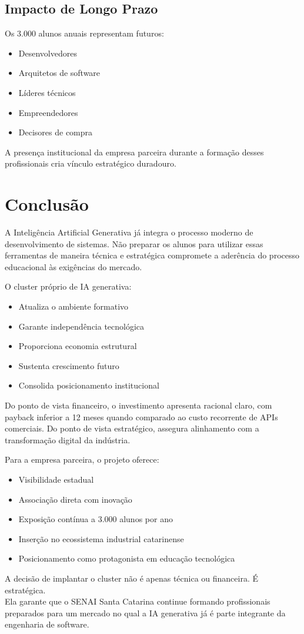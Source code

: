 \documentclass[12pt,a4paper,]{abntex2}
\begin{document}
\section{Impacto de Longo Prazo}
Os 3.000 alunos anuais representam futuros:
\begin{itemize}
    \item Desenvolvedores
    \item Arquitetos de software
    \item Líderes técnicos
    \item Empreendedores
    \item Decisores de compra
\end{itemize}

A presença institucional da empresa parceira durante a formação desses profissionais cria vínculo estratégico duradouro.

\chapter{Conclusão}

A Inteligência Artificial Generativa já integra o processo moderno de desenvolvimento de sistemas.
Não preparar os alunos para utilizar essas ferramentas de maneira técnica e estratégica compromete a aderência do processo educacional às exigências do mercado.

O cluster próprio de IA generativa:
\begin{itemize}
    \item Atualiza o ambiente formativo
    \item Garante independência tecnológica
    \item Proporciona economia estrutural
    \item Sustenta crescimento futuro
    \item Consolida posicionamento institucional
\end{itemize}

Do ponto de vista financeiro, o investimento apresenta racional claro, com payback inferior a 12 meses quando comparado ao custo recorrente de APIs comerciais.
Do ponto de vista estratégico, assegura alinhamento com a transformação digital da indústria.

Para a empresa parceira, o projeto oferece:
\begin{itemize}
    \item Visibilidade estadual
    \item Associação direta com inovação
    \item Exposição contínua a 3.000 alunos por ano
    \item Inserção no ecossistema industrial catarinense
    \item Posicionamento como protagonista em educação tecnológica
\end{itemize}

A decisão de implantar o cluster não é apenas técnica ou financeira. É estratégica.
\\Ela garante que o SENAI Santa Catarina continue formando profissionais preparados para um mercado no qual a IA generativa já é parte integrante da engenharia de software.
\end{document}
